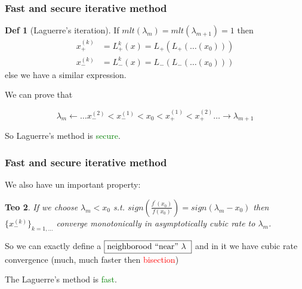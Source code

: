 \documentclass{beamer}
\theoremstyle{definition} \newtheorem{de}{Def}
\theoremstyle{remark} \newtheorem{os}[de]{Oss}
\theoremstyle{plain} \newtheorem{te}[de]{Teo}
\theoremstyle{plain} \newtheorem{co}[de]{Cor}
\theoremstyle{plain} \newtheorem{pr}[de]{Prop}
\theoremstyle{plain} \newtheorem{lem}[de]{Lemm}
\theoremstyle{remark} \newtheorem{rem}[de]{Remark}
\begin{document}
\begin{frame}
\frametitle{Fast and secure iterative method}

\begin{de}[Laguerre's iteration]
  If $mlt(\lambda_m)=mlt(\lambda_{m+1})=1$ then
  \begin{align*}
    x_{+}^{(k)} &= L_{+}^k(x)=L_{+}(L_{+}(\dots(x_{0})))\\
    x_{-}^{(k)} &= L_{-}^k(x)=L_{-}(L_{-}(\dots(x_{0})))
  \end{align*}
  else we have a similar expression.
\end{de} 

\pause

We can prove that

\begin{equation*}
  \lambda_m \leftarrow \dots x_{-}^{(2)} < x_{-}^{(1)} < x_{0} < x_{+}^{(1)} < x_{+}^{(2)} \dots \rightarrow \lambda_{m+1}
\end{equation*}
  
\pause

So Laguerre's method is \textcolor{green}{secure}.

\end{frame}


\begin{frame}
\frametitle{Fast and secure iterative method}

We also have un important property:

\begin{te}
  If we choose $\lambda_m < x_0$ s.t. 
$sign( \frac{f^{'}(x_0)}{f(x_0)} ) = sign(\lambda_m - x_0)$ then 
$\{ x_{-}^{(k)} \}_{k=1,\dots}$ converge monotonically in asymptotically 
cubic rate to $\lambda_m$. 
\end{te}

\pause

So we can exactly define a $\fbox{neighborood ``near'' $\lambda$ }$ and in it we
have cubic rate convergence (much, much faster then \textcolor{red}{bisection}) 

\pause


\pause

The Laguerre's method is \textcolor{green}{fast}.

\end{frame}
\end{document}
